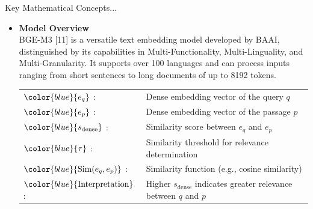 \begin{frame}{Key Mathematical Concepts...}
    \begin{itemize}
        \item \textbf{Model Overview} \\
        BGE-M3 [11] is a versatile text embedding model developed by BAAI, distinguished by its capabilities in Multi-Functionality, Multi-Linguality, and Multi-Granularity. It supports over 100 languages and can process inputs ranging from short sentences to long documents of up to 8192 tokens.

        \begin{center}
        \begin{tabular}{p{3cm} p{7.5cm}} %
            \(\color{blue}{e_q}\) : & Dense embedding vector of the query \(q\) \\
            \(\color{blue}{e_p}\) : & Dense embedding vector of the passage \(p\) \\
            \(\color{blue}{s_{\text{dense}}}\) : & Similarity score between \(e_q\) and \(e_p\) \\
            \(\color{blue}{\tau}\) : & Similarity threshold for relevance determination \\
            \(\color{blue}{\text{Sim}(e_q, e_p)}\) : & Similarity function (e.g., cosine similarity) \\
            \(\color{blue}{\text{Interpretation}}\) : & Higher \(s_{\text{dense}}\) indicates greater relevance between \(q\) and \(p\)
        \end{tabular}
        \end{center}
    \end{itemize}
    \vspace{0.3cm}
\end{frame}

